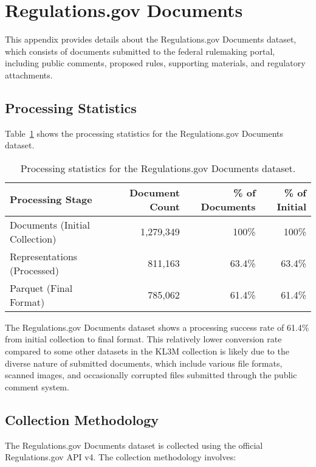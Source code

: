 \section{Regulations.gov Documents}
\label{appendix:reg_docs}

This appendix provides details about the Regulations.gov Documents dataset, which consists of documents submitted to the federal rulemaking portal, including public comments, proposed rules, supporting materials, and regulatory attachments.

\subsection{Processing Statistics}

Table~\ref{table:reg-docs-stats} shows the processing statistics for the Regulations.gov Documents dataset.

\begin{table}[h]
\centering
\begin{tabular}{|l|r|r|r|}
\hline
\textbf{Processing Stage} & \textbf{Document Count} & \textbf{\% of Documents} & \textbf{\% of Initial} \\
\hline
Documents (Initial Collection) & 1,279,349 & 100\% & 100\% \\
Representations (Processed) & 811,163 & 63.4\% & 63.4\% \\
Parquet (Final Format) & 785,062 & 61.4\% & 61.4\% \\
\hline
\end{tabular}
\caption{Processing statistics for the Regulations.gov Documents dataset.}
\label{table:reg-docs-stats}
\end{table}

The Regulations.gov Documents dataset shows a processing success rate of 61.4\% from initial collection to final format. This relatively lower conversion rate compared to some other datasets in the KL3M collection is likely due to the diverse nature of submitted documents, which include various file formats, scanned images, and occasionally corrupted files submitted through the public comment system.

\subsection{Collection Methodology}

The Regulations.gov Documents dataset is collected using the official Regulations.gov API v4. The collection methodology involves:

